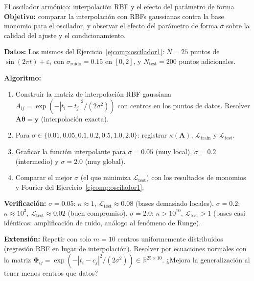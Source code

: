 \begin{ejerciciocomp}{El oscilador armónico: interpolación RBF y el efecto
  del parámetro de forma}
\label{ejcomp:oscilador_rbf}
\textbf{Objetivo:} comparar la interpolación con RBFs gaussianas contra
la base monomio para el oscilador, y observar el efecto del parámetro de
forma $\sigma$ sobre la calidad del ajuste y el condicionamiento.

\medskip\noindent\textbf{Datos:}
Los mismos del Ejercicio~\ref{ejcomp:oscilador1}: $N = 25$ puntos de
$\sin(2\pi t) + \varepsilon_i$ con $\sigma_{\text{ruido}} = 0.15$ en
$[0, 2]$, y $N_{\text{test}} = 200$ puntos adicionales.

\medskip\noindent\textbf{Algoritmo:}
\begin{enumerate}
  \item Construir la matriz de interpolación RBF gaussiana
        $A_{ij} = \exp(-|t_i - t_j|^2/(2\sigma^2))$ con centros en los
        puntos de datos. Resolver $\bm{A}\bm{\theta} = \bm{y}$
        (interpolación exacta).
  \item Para $\sigma \in \{0.01, 0.05, 0.1, 0.2, 0.5, 1.0, 2.0\}$:
        registrar $\kappa(\bm{A})$, $\mathcal{L}_{\text{train}}$ y
        $\mathcal{L}_{\text{test}}$.
  \item Graficar la función interpolante para $\sigma = 0.05$ (muy local),
        $\sigma = 0.2$ (intermedio) y $\sigma = 2.0$ (muy global).
  \item Comparar el mejor $\sigma$ (el que minimiza
        $\mathcal{L}_{\text{test}}$) con los resultados de monomios y
        Fourier del Ejercicio~\ref{ejcomp:oscilador1}.
\end{enumerate}

\medskip\noindent\textbf{Verificación:}
$\sigma = 0.05$: $\kappa \approx 1$,
$\mathcal{L}_{\text{test}} \approx 0.08$ (bases demasiado locales).
$\sigma = 0.2$: $\kappa \approx 10^3$,
$\mathcal{L}_{\text{test}} \approx 0.02$ (buen compromiso).
$\sigma = 2.0$: $\kappa > 10^{10}$,
$\mathcal{L}_{\text{test}} > 1$ (bases casi idénticas: amplificación de
ruido, análogo al fenómeno de Runge).

\medskip\noindent\textbf{Extensión:}
Repetir con solo $m = 10$ centros uniformemente distribuidos (regresión
RBF en lugar de interpolación). Resolver por ecuaciones normales con la
matriz $\bm{\Phi}_{ij} = \exp(-|t_i-c_j|^2/(2\sigma^2)) \in
\mathbb{R}^{25 \times 10}$. ¿Mejora la generalización al tener menos
centros que datos?
\end{ejerciciocomp}

